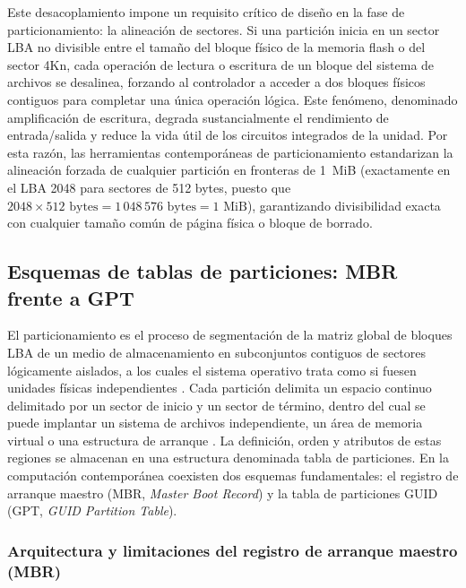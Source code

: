 \documentclass[12pt]{article}
\begin{document}
Este desacoplamiento impone un requisito crítico de diseño en la fase de particionamiento: la alineación de sectores. Si una partición inicia en un sector LBA no divisible entre el tamaño del bloque físico de la memoria flash o del sector 4Kn, cada operación de lectura o escritura de un bloque del sistema de archivos se desalinea, forzando al controlador a acceder a dos bloques físicos contiguos para completar una única operación lógica. Este fenómeno, denominado amplificación de escritura, degrada sustancialmente el rendimiento de entrada/salida y reduce la vida útil de los circuitos integrados de la unidad. Por esta razón, las herramientas contemporáneas de particionamiento estandarizan la alineación forzada de cualquier partición en fronteras de 1~MiB (exactamente en el LBA 2048 para sectores de 512 bytes, puesto que $2048 \times 512\text{ bytes} = 1\,048\,576\text{ bytes} = 1\text{ MiB}$), garantizando divisibilidad exacta con cualquier tamaño común de página física o bloque de borrado.

\subsection{Esquemas de tablas de particiones: MBR frente a GPT}
\label{sec:esquemasParticiones}

El particionamiento es el proceso de segmentación de la matriz global de bloques LBA de un medio de almacenamiento en subconjuntos contiguos de sectores lógicamente aislados, a los cuales el sistema operativo trata como si fuesen unidades físicas independientes \parencite[\S 12.5.1, pp.\ 418--419]{silberschatz2006fundamentos}. Cada partición delimita un espacio continuo delimitado por un sector de inicio y un sector de término, dentro del cual se puede implantar un sistema de archivos independiente, un área de memoria virtual o una estructura de arranque \parencite[\S 7.4, pp.\ 377--378]{carretero2001sistemas}. La definición, orden y atributos de estas regiones se almacenan en una estructura denominada tabla de particiones. En la computación contemporánea coexisten dos esquemas fundamentales: el registro de arranque maestro (MBR, \textit{Master Boot Record}) y la tabla de particiones GUID (GPT, \textit{GUID Partition Table}).

\subsubsection{Arquitectura y limitaciones del registro de arranque maestro (MBR)}
\end{document}
